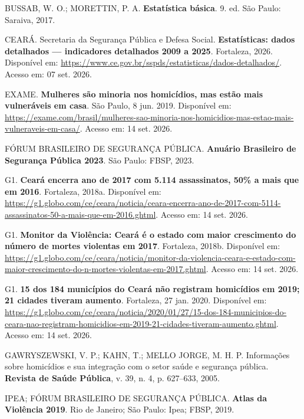 \documentclass[12pt,a4paper]{article}
\begin{document}
\begin{description}
\item BUSSAB, W. O.; MORETTIN, P. A. \textbf{Estatística básica}. 9. ed. São Paulo: Saraiva, 2017.

\item CEARÁ. Secretaria da Segurança Pública e Defesa Social. \textbf{Estatísticas: dados detalhados --- indicadores detalhados 2009 a 2025}. Fortaleza, 2026. Disponível em: \url{https://www.ce.gov.br/sspds/estatisticas/dados-detalhados/}. Acesso em: 07 set. 2026.

\item EXAME. \textbf{Mulheres são minoria nos homicídios, mas estão mais vulneráveis em casa}. São Paulo, 8 jun. 2019. Disponível em: \url{https://exame.com/brasil/mulheres-sao-minoria-nos-homicidios-mas-estao-mais-vulneraveis-em-casa/}. Acesso em: 14 set. 2026.

\item FÓRUM BRASILEIRO DE SEGURANÇA PÚBLICA. \textbf{Anuário Brasileiro de Segurança Pública 2023}. São Paulo: FBSP, 2023.

\item G1. \textbf{Ceará encerra ano de 2017 com 5.114 assassinatos, 50\% a mais que em 2016}. Fortaleza, 2018a. Disponível em: \url{https://g1.globo.com/ce/ceara/noticia/ceara-encerra-ano-de-2017-com-5114-assassinatos-50-a-mais-que-em-2016.ghtml}. Acesso em: 14 set. 2026.

\item G1. \textbf{Monitor da Violência: Ceará é o estado com maior crescimento do número de mortes violentas em 2017}. Fortaleza, 2018b. Disponível em: \url{https://g1.globo.com/ce/ceara/noticia/monitor-da-violencia-ceara-e-estado-com-maior-crescimento-do-n-mortes-violentas-em-2017.ghtml}. Acesso em: 14 set. 2026.

\item G1. \textbf{15 dos 184 municípios do Ceará não registram homicídios em 2019; 21 cidades tiveram aumento}. Fortaleza, 27 jan. 2020. Disponível em: \url{https://g1.globo.com/ce/ceara/noticia/2020/01/27/15-dos-184-municipios-do-ceara-nao-registram-homicidios-em-2019-21-cidades-tiveram-aumento.ghtml}. Acesso em: 14 set. 2026.

\item GAWRYSZEWSKI, V. P.; KAHN, T.; MELLO JORGE, M. H. P. Informações sobre homicídios e sua integração com o setor saúde e segurança pública. \textbf{Revista de Saúde Pública}, v. 39, n. 4, p. 627--633, 2005.

\item IPEA; FÓRUM BRASILEIRO DE SEGURANÇA PÚBLICA. \textbf{Atlas da Violência 2019}. Rio de Janeiro; São Paulo: Ipea; FBSP, 2019.


\end{description}
\end{document}
